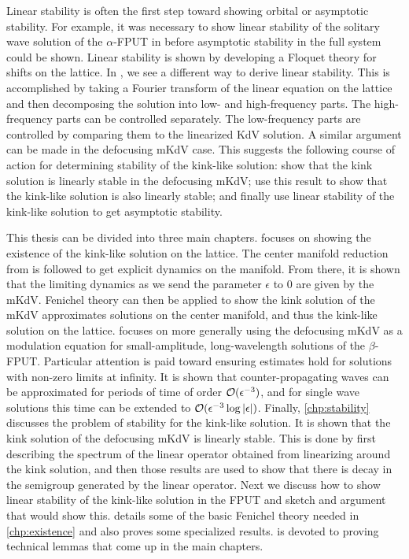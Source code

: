 Linear stability is often the first step toward showing orbital or asymptotic stability. For example, it was necessary to show linear stability of the solitary wave solution of the \(\alpha\)-FPUT in \cite{friesecke2003solitary,friesecke2004solitary} before asymptotic stability in the full system could be shown. Linear stability is shown by developing a Floquet theory for shifts on the lattice. In \cite{mizumachi2013asymptotic}, we see a different way to derive linear stability. This is accomplished by taking a Fourier transform of the linear equation on the lattice and then decomposing the solution into low- and high-frequency parts. The high-frequency parts can be controlled separately. The low-frequency parts are controlled by comparing them to the linearized KdV solution. A similar argument can be made in the defocusing mKdV case. This suggests the following course of action for determining stability of the kink-like solution: show that the kink solution is linearly stable in the defocusing mKdV; use this result to show that the kink-like solution is also linearly stable; and finally use linear stability of the kink-like solution to get asymptotic stability.

This thesis can be divided into three main chapters.  focuses on showing the existence of the kink-like solution on the lattice. The center manifold reduction from \cite{iooss2000travelling} is followed to get explicit dynamics on the manifold. From there, it is shown that the limiting dynamics as we send the parameter \(\epsilon\) to \(0\) are given by the mKdV. Fenichel theory can then be applied to show the kink solution of the mKdV approximates solutions on the center manifold, and thus the kink-like solution on the lattice.  focuses on more generally using the defocusing  mKdV as a modulation equation for small-amplitude, long-wavelength solutions of the \(\beta\)-FPUT. Particular attention is paid toward ensuring estimates hold for solutions with non-zero limits at infinity. It is shown that counter-propagating waves can be approximated for periods of time of order \(\mathcal{O}(\epsilon^{-3})\), and for single wave solutions this time can be extended to \(\mathcal{O}(\epsilon^{-3} \log|\epsilon|)\). Finally, \cref{chp:stability} discusses the problem of stability for the kink-like solution. It is shown that the kink solution of the defocusing mKdV is linearly stable. This is done by first describing the spectrum of the linear operator obtained from linearizing around the kink solution, and then those results are used to show that there is decay in the semigroup generated by the linear operator. Next we discuss how to show linear stability of the kink-like solution in the FPUT and sketch and argument that would show this.  details some of the basic Fenichel theory needed in \cref{chp:existence} and also proves some specialized results.  is devoted to proving technical lemmas that come up in the main chapters.